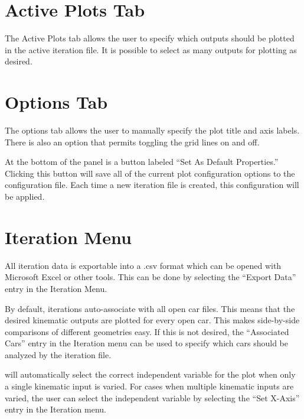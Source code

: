 \section{Active Plots Tab} \label{sec:activePlotsTab}

The Active Plots tab allows the user to specify which outputs should be plotted in the active iteration file.  It is possible to select as many outputs for plotting as desired.

\section{Options Tab} \label{sec:optionsTab}

The options tab allows the user to manually specify the plot title and axis labels.  There is also an option that permits toggling the grid lines on and off.

At the bottom of the panel is a button labeled ``Set As Default Properties.''  Clicking this button will save all of the current plot configuration options to the configuration file.  Each time a new iteration file is created, this configuration will be applied.

\section{Iteration Menu} \label{sec:iterationMenu}

All iteration data is exportable into a .csv format which can be opened with Microsoft Excel or other tools.  This can be done by selecting the ``Export Data'' entry in the Iteration Menu.

By default, iterations auto-associate with all open car files.  This means that the desired kinematic outputs are plotted for every open car.  This makes side-by-side comparisons of different geometries easy.  If this is not desired, the ``Associated Cars'' entry in the Iteration menu can be used to specify which cars should be analyzed by the iteration file.

\vvase{} will automatically select the correct independent variable for the plot when only a single kinematic input is varied.  For cases when multiple kinematic inputs are varied, the user can select the independent variable by selecting the ``Set X-Axis'' entry in the Iteration menu.
